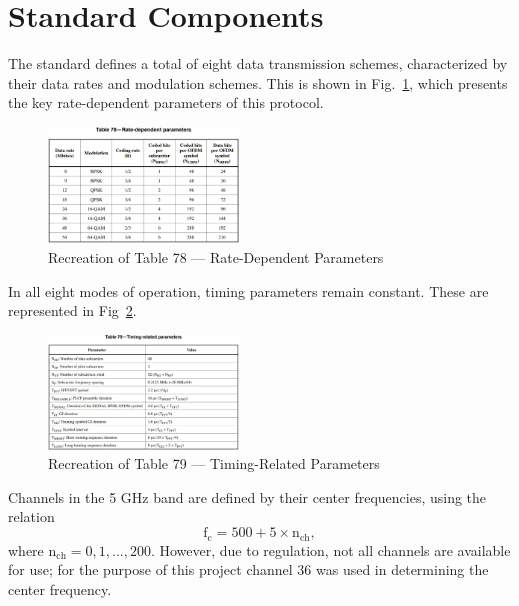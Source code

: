 \documentclass[journal]{IEEEtran}
\begin{document}
\section{Standard Components} \label{sec:standard_components}
The standard defines a total of eight data transmission schemes, characterized by their data rates and modulation schemes. This is shown in Fig.~\ref{fig:rate_params}, which presents the key rate-dependent parameters of this protocol.
\begin{figure}
    \centering
    \includegraphics[width = 0.45\textwidth]{RateDepParams}
    \caption{Recreation of Table 78 --- Rate-Dependent Parameters}
    \label{fig:rate_params}
\end{figure}

In all eight modes of operation, timing parameters remain constant. These are represented in Fig~\ref{fig:time_params}.
\begin{figure}
    \centering
    \includegraphics[width = 0.45\textwidth]{TimeDepParams}
    \caption{Recreation of Table 79 --- Timing-Related Parameters}
    \label{fig:time_params}
\end{figure}

Channels in the 5 GHz band are defined by their center frequencies, using the relation
\begin{equation}
\text{f}_\text{c} = 500 + 5 \times \text{n}_\text{ch},
\end{equation}
where $\text{n}_\text{ch} = 0,1,...,200$. However, due to regulation, not all channels are available for use; for the purpose of this project channel 36 was used in determining the center frequency.
\end{document}
